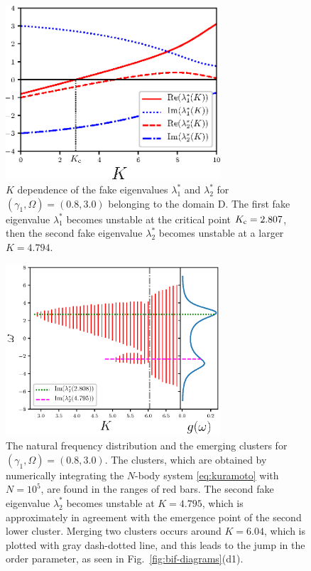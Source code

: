 \begin{figure}[htbp]
  \begin{center}  
  \includegraphics[width=8cm]{figs/ev0830.eps}
  \end{center}
  \caption{$K$ dependence of the
    fake eigenvalues $\lambda_{1}^{\ast}$ and $\lambda_{2}^{\ast}$
    for $(\gamma_{1},\Omega)=(0.8,3.0)$ belonging to the domain D.
    The first fake eigenvalue $\lambda^{\ast}_{1}$ becomes unstable
    at the critical point $K_{\rm c}=2.807$,
    then the second fake eigenvalue $\lambda^{\ast}_{2}$ becomes
    unstable at a larger $K=4.794$.
  }
  \label{fig:ev0830}
\end{figure}

\begin{figure}[htbp]
\begin{center}
  \includegraphics[width=8cm]{figs/cluster1.eps}
\end{center}
  \caption{
    The natural frequency distribution and the emerging clusters
    for $(\gamma_{1},\Omega)=(0.8,3.0)$.
    The clusters, which are obtained by numerically integrating
    the $N$-body system \eqref{eq:kuramoto} with $N=10^{5}$,
    are found in the ranges of red bars.
    The second fake eigenvalue $\lambda_{2}^{\ast}$
    becomes unstable at $K=4.795$,
    which is approximately in agreement with the emergence point of the second lower cluster.
      Merging two clusters occurs around $K=6.04$, which is 
      plotted with gray dash-dotted line,
      and this leads to the jump in the order parameter,
      as seen in Fig.~\ref{fig:bif-diagrams}(d1).
  }
  \label{fig:cluster1}
\end{figure}


